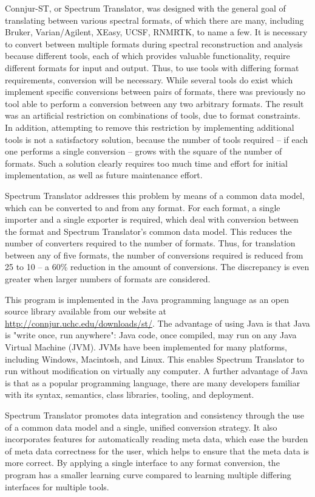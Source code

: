 Connjur-ST, or Spectrum Translator, was designed with the general goal of
translating between various spectral formats, of which there are many, 
including Bruker, Varian/Agilent, XEasy, UCSF, RNMRTK, to name a few.  
It is necessary to convert between multiple formats during spectral 
reconstruction and analysis because different tools, each of which provides
valuable functionality, require different formats for input and output.
Thus, to use tools with differing format requirements, conversion will be
necessary.  While several tools do exist which implement specific conversions
between pairs of formats, there was previously no tool able to perform a
conversion between any two arbitrary formats.  The result was an artificial
restriction on combinations of tools, due to format constraints.  In addition,
attempting to remove this restriction by implementing additional tools is not
a satisfactory solution, because the number of tools required -- if each one
performs a single conversion -- grows with the square of the number of formats.
Such a solution clearly requires too much time and effort for initial
implementation, as well as future maintenance effort.

Spectrum Translator addresses this problem by means of a common data model,
which can be converted to and from any format.  For each format, a single
importer and a single exporter is required, which deal with conversion between
the format and Spectrum Translator's common data model.  This reduces the number
of converters required to the number of formats.  Thus, for translation between
any of five formats, the number of conversions required is reduced from 25 to
10 -- a 60\% reduction in the amount of conversions.  The discrepancy is even
greater when larger numbers of formats are considered.

This program is implemented in the Java programming language as an open source
library available from our website at \url{http://connjur.uchc.edu/downloads/st/}.
The advantage of using Java is that Java is "write once, run anywhere": Java
code, once compiled, may run on any Java Virtual Machine (JVM).  JVMs have been
implemented for many platforms, including Windows, Macintosh, and Linux.
This enables Spectrum Translator to run without modification on virtually any
computer.  A further advantage of Java is that as a popular programming 
language, there are many developers familiar with its syntax, semantics, 
class libraries, tooling, and deployment.

Spectrum Translator promotes data integration and consistency through the use
of a common data model and a single, unified conversion strategy.  It also
incorporates features for automatically reading meta data, which ease the
burden of meta data correctness for the user, which helps to ensure that the
meta data is more correct.  By applying a single interface to any format
conversion, the program has a smaller learning curve compared to learning
multiple differing interfaces for multiple tools.

